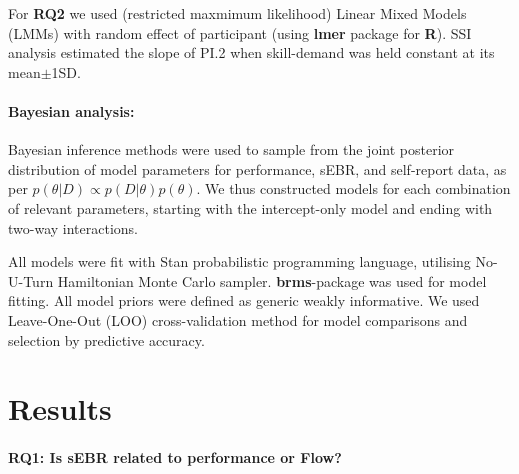 \documentclass[10pt,letterpaper,floatsintext]{article}
\begin{document}
For \textbf{RQ2} we used (restricted maxmimum likelihood) Linear Mixed Models (LMMs) with random effect of participant (using {\bf lmer} package for {\bf R}). SSI analysis estimated the slope of PI.2 when skill-demand was held constant at its mean$\pm$1SD.

\paragraph{Bayesian analysis:}
Bayesian inference methods were used to sample from the joint posterior distribution of model parameters for performance, sEBR, and self-report data, as per $p(\theta|D) \propto p(D|\theta)p(\theta)$. We thus constructed models for each combination of relevant parameters, starting with the intercept-only model and ending with two-way interactions.  


All models were fit with Stan probabilistic programming language, utilising No-U-Turn Hamiltonian Monte Carlo sampler. {\bf brms}-package was used for model fitting. All model priors were defined as generic weakly informative. We used Leave-One-Out (LOO) cross-validation method for model comparisons and selection by predictive accuracy.

\section{Results}

\paragraph{RQ1: Is sEBR related to performance or Flow?}
\end{document}
